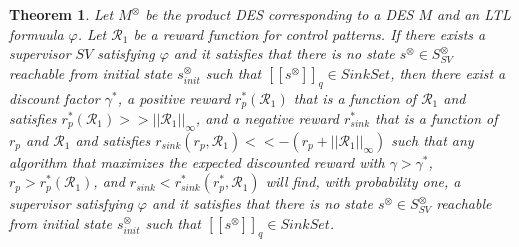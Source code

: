 \documentclass[10pt]{article}
\newtheorem{theorem}{Theorem}
\theoremstyle{definition}
\newcommand{\myspq}{\ensuremath{[\![s^{\otimes}]\!]}_q}
\begin{document}
\begin{theorem}
  Let $M^{\otimes}$ be the product DES corresponding to a DES $M$ and an LTL formuula $\varphi$. Let $\mathcal{R}_1$ be a reward function for control patterns. %
  If there exists a supervisor $SV$ satisfying $\varphi$ and it satisfies that there is no state $s^{\otimes} \in S^{\otimes}_{SV}$ reachable from initial state $s^{\otimes}_{init}$ such that $\myspq \in SinkSet$, then there exist a discount factor $\gamma^{\ast}$, a positive reward $r^{\ast}_p(\mathcal{R}_1)$ that is a function of $\mathcal{R}_1$ and satisfies $ r^{\ast}_p(\mathcal{R}_1) >> ||\mathcal{R}_1||_{\infty}$, and a negative reward $r^{\ast}_{sink}$ that is a function of $r_p$ and $\mathcal{R}_1$ and satisfies $r_{sink}(r_p, \mathcal{R}_1) << - (r_p + ||\mathcal{R}_1||_{\infty}) $ such that any algorithm that maximizes the expected discounted reward with $\gamma > \gamma^{\ast}$, $r_p > r^{\ast}_p(\mathcal{R}_1)$, and $r_{sink} < r^{\ast}_{sink}(r^{\ast}_p, \mathcal{R}_1)$ will find, with probability one, a supervisor satisfying $\varphi$ and it satisfies that there is no state $s^{\otimes} \in S^{\otimes}_{SV}$ reachable from initial state $s^{\otimes}_{init}$ such that $\myspq \in SinkSet$.
\end{theorem}
\end{document}
